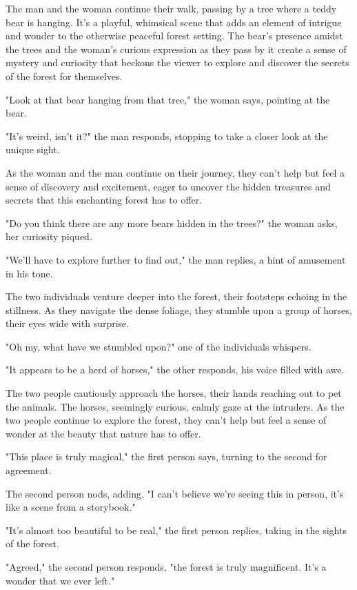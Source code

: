 \documentclass[smalldemyvopaper,11pt,twoside,onecolumn,openright,extrafontsizes]{memoir}
\begin{document}
The man and the woman continue their walk, passing by a tree where a teddy bear is hanging. It's a playful, whimsical scene that adds an element of intrigue and wonder to the otherwise peaceful forest setting. The bear's presence amidst the trees and the woman's curious expression as they pass by it create a sense of mystery and curiosity that beckons the viewer to explore and discover the secrets of the forest for themselves.\par
"Look at that bear hanging from that tree," the woman says, pointing at the bear.\par
"It's weird, isn't it?" the man responds, stopping to take a closer look at the unique sight.\par
As the woman and the man continue on their journey, they can't help but feel a sense of discovery and excitement, eager to uncover the hidden treasures and secrets that this enchanting forest has to offer.\par
"Do you think there are any more bears hidden in the trees?" the woman asks, her curiosity piqued.\par
"We'll have to explore further to find out," the man replies, a hint of amusement in his tone.\par
The two individuals venture deeper into the forest, their footsteps echoing in the stillness. As they navigate the dense foliage, they stumble upon a group of horses, their eyes wide with surprise.\par
"Oh my, what have we stumbled upon?" one of the individuals whispers.\par
"It appears to be a herd of horses," the other responds, his voice filled with awe.\par
The two people cautiously approach the horses, their hands reaching out to pet the animals. The horses, seemingly curious, calmly gaze at the intruders. As the two people continue to explore the forest, they can't help but feel a sense of wonder at the beauty that nature has to offer.\par
"This place is truly magical," the first person says, turning to the second for agreement.\par
The second person nods, adding, "I can't believe we're seeing this in person, it's like a scene from a storybook."\par
"It's almost too beautiful to be real," the first person replies, taking in the sights of the forest.\par
"Agreed," the second person responds, "the forest is truly magnificent. It's a wonder that we ever left."\par
\end{document}
